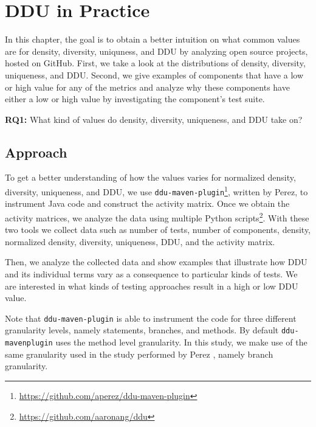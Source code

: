 \documentclass[twoside,a4paper,11pt]{memoir}
\begin{document}
\chapter{DDU in Practice}
\label{ch:rq1}

In this chapter, the goal is to obtain a better intuition on what common values are for density, diversity, uniquness, and DDU by analyzing open source projects, hosted on GitHub.
First, we take a look at the distributions of density, diversity, uniqueness, and DDU.
Second, we give examples of components that have a low or high value for any of the metrics and analyze why these components have either a low or high value by investigating the component's test suite.

\begin{framed}
\noindent
\textbf{RQ1:} What kind of values do density, diversity, uniqueness, and DDU take on?
\end{framed}

\section{Approach}

To get a better understanding of how the values varies for normalized density, diversity, uniqueness, and DDU, we use \texttt{ddu-maven-plugin}\footnote{\url{https://github.com/aperez/ddu-maven-plugin}}, written by Perez, to instrument Java code and construct the activity matrix.
Once we obtain the activity matrices, we analyze the data using multiple Python scripts\footnote{\url{https://github.com/aaronang/ddu}}.
With these two tools we collect data such as number of tests, number of components, density, normalized density, diversity, uniqueness, DDU, and the activity matrix.

Then, we analyze the collected data and show examples that illustrate how DDU and its individual terms vary as a consequence to particular kinds of tests.
We are interested in what kinds of testing approaches result in a high or low DDU value.

Note that \texttt{ddu-maven-plugin} is able to instrument the code for three different granularity levels, namely statements, branches, and methods.
By default \texttt{ddu-maven\-plugin} uses the method level granularity.
In this study, we make use of the same granularity used in the study performed by Perez \etal \cite{DBLP:conf/icse/PerezAD17}, namely branch granularity.
%
\end{document}

